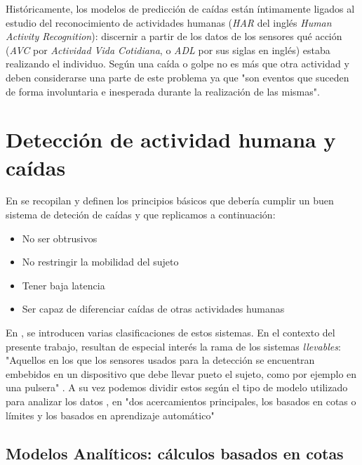 \documentclass[../tfm.tex]{subfiles}
\begin{document}
Históricamente, los modelos de predicción de caídas están íntimamente ligados al estudio del reconocimiento de actividades humanas (\textit{HAR} del inglés \textit{Human Activity Recognition}): discernir a partir de los datos de los sensores qué acción (\textit{AVC} por \textit{Actividad Vida Cotidiana}, o \textit{ADL} por sus siglas en inglés) estaba realizando el individuo. Según \cite[p.10692]{Ozdemir2014} una caída o golpe no es más que otra actividad y deben considerarse una parte de este problema ya que "son eventos que suceden de forma involuntaria e inesperada durante la realización de las mismas".


\section{Detección de actividad humana y caídas}\label{sect:sa_har}

En \cite[p.2]{Anita2020} se recopilan y definen los principios básicos que debería cumplir un buen sistema de deteción de caídas y que replicamos a continuación:

\begin{itemize}
  \item No ser obtrusivos
  \item No restringir la mobilidad del sujeto
  \item Tener baja latencia
  \item Ser capaz de diferenciar caídas de otras actividades humanas
\end{itemize}

En \cite{Musci2020,Anita2020}, se introducen varias clasificaciones de estos sistemas. En el contexto del presente trabajo, resultan de especial interés la rama de los sistemas \textit{llevables}: "Aquellos en los que los sensores usados para la detección se encuentran embebidos en un dispositivo que debe llevar pueto el sujeto, como por ejemplo en una pulsera" \cite[p.3]{Anita2020}. A su vez podemos dividir estos según el tipo de modelo utilizado para analizar los datos \cite{Anita2020,Lim2014}, en "dos acercamientos principales, los basados en cotas o límites y los basados en aprendizaje automático"\cite[p.1]{Lim2014}


\subsection{Modelos Analíticos: cálculos basados en cotas}\label{sa_modelos_analiticos}
\end{document}
